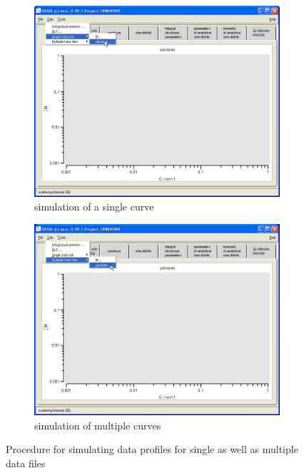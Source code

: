 \begin{figure}[htb]
\begin{subfigure}[b]{.48\textwidth}
   \centering
   \includegraphics[width=\textwidth]{QTsimulateSDS.png}
   \caption{simulation of a single curve}
   \label{fig:QTsimulateSDS}
\end{subfigure}
\hfill
\begin{subfigure}[b]{0.48\textwidth}
   \centering
   \includegraphics[width=\textwidth]{QTsimulateMDS.png}
   \caption{simulation of multiple curves}
   \label{fig:QTsimulateMDS}
\end{subfigure}
\caption{Procedure for simulating data profiles for single as well as multiple data files}
\label{fig:QTsimulateDS}
\end{figure}


